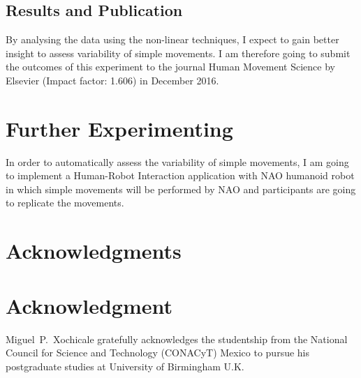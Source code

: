 \documentclass[9pt,journal,onecolumn,compsoc]{IEEEtran}
\begin{document}
\subsection{Results and Publication}
By analysing the data using the non-linear techniques, I expect to
gain better insight to assess variability of simple movements.
I am therefore going to submit the outcomes of this experiment to
the journal Human Movement Science by Elsevier (Impact factor: 1.606) in December 2016.


\section{Further Experimenting}

In order to automatically assess the variability of simple movements,
I am going to implement a Human-Robot Interaction application
with NAO humanoid robot \cite{NAO}
in which simple movements will be performed by NAO
and participants are going to replicate the movements.


\ifCLASSOPTIONcompsoc
  \section*{Acknowledgments}
\else
  \section*{Acknowledgment}
\fi

Miguel~P.~Xochicale gratefully acknowledges the studentship from
the National Council for Science and Technology (CONACyT) Mexico
to pursue his postgraduate studies at University of Birmingham U.K.

\ifCLASSOPTIONcaptionsoff
  \newpage
\fi





%
%
%
%
%
\end{document}
